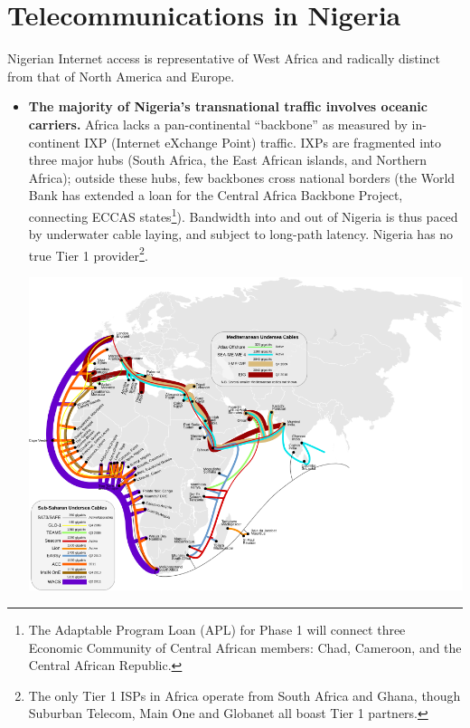 \documentclass[]{sigplanconf}
\begin{document}
\section{Telecommunications in Nigeria}
Nigerian Internet access is representative of West Africa and radically
distinct from that of North America and Europe.
\begin{itemize}
\item	\textbf{The majority of Nigeria's transnational traffic involves
	oceanic carriers.}
	Africa lacks a pan-continental ``backbone'' as measured by in-continent
	IXP (Internet eXchange Point) traffic\cite{pingdom}. IXPs are fragmented
	into three major hubs (South Africa, the East African islands, and
	Northern Africa); outside these hubs, few backbones cross national
	borders (the World Bank has extended a loan for the
	Central Africa Backbone Project, connecting ECCAS
	states\footnote{The Adaptable Program Loan (APL) for Phase 1 will
	connect three Economic Community of Central African members: Chad, Cameroon,
	and the Central African Republic\cite{apl1a}.}). Bandwidth
	into and out of Nigeria is thus paced by underwater cable laying, and
	subject to long-path latency. Nigeria has no true Tier 1 provider\footnote{The only
	Tier 1 ISPs in Africa operate from South Africa and Ghana\cite{drpeering}, though
	Suburban Telecom\cite{suburban}, Main One and Globanet all boast
	Tier 1 partners.}.
	
\includegraphics[scale=.4]{subsahara.png}


\end{itemize}
\end{document}
